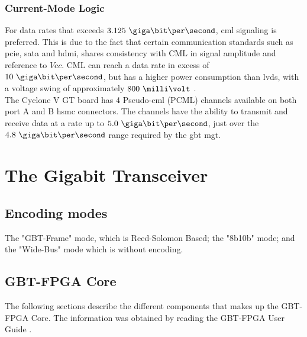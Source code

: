 \documentclass[main.tex]{subfiles}
\begin{document}
\subsection{Current-Mode Logic}

For data rates that exceeds $3.125\ \giga\bit\per\second$, \gls{cml} signaling is preferred. This is due to the fact that certain communication standards such as \acrshort{pcie}, \acrshort{sata} and \acrshort{hdmi}, shares consistency with CML in signal amplitude and reference to $Vcc$. CML can reach a data rate in excess of $10\ \giga\bit\per\second$, but has a higher power consumption than \gls{lvds}, with a voltage swing of approximately $800\ \milli\volt$ \cite{ti08lvds}.\\

The Cyclone V GT board has 4 Pseudo-\gls{cml} (PCML) channels available on both port A and B \gls{hsmc} connectors. The channels have the ability to transmit and receive data at a rate up to $5.0\ \giga\bit\per\second$, just over the $4.8\ \giga\bit\per\second$ range required by the \gls{gbt} \gls{mgt}. \cite{altera_cyclonekit}






\chapter{The Gigabit Transceiver} \label{chap:gbt}


\section{Encoding modes}

The "GBT-Frame" mode, which is Reed-Solomon Based; the "8b10b" mode; and the "Wide-Bus" mode which is without encoding.

\section{GBT-FPGA Core}
The following sections describe the different components that makes up the GBT-FPGA Core. The information was obtained by reading the GBT-FPGA User Guide \cite{gbt_fpga}.
\end{document}

